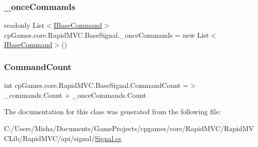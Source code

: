 \subsubsection{\texorpdfstring{\_onceCommands}{\_onceCommands}}
{\footnotesize\ttfamily readonly List$<$\mbox{\hyperlink{interfacecp_games_1_1core_1_1_rapid_m_v_c_1_1_i_base_command}{I\+Base\+Command}}$>$ cp\+Games.\+core.\+Rapid\+M\+V\+C.\+Base\+Signal.\+\_\+once\+Commands = new List$<$\mbox{\hyperlink{interfacecp_games_1_1core_1_1_rapid_m_v_c_1_1_i_base_command}{I\+Base\+Command}}$>$()\hspace{0.3cm}{\ttfamily [protected]}}

\mbox{\label{classcp_games_1_1core_1_1_rapid_m_v_c_1_1_base_signal_a3f273a225810de09d155144a5e948257}} 
\subsubsection{\texorpdfstring{CommandCount}{CommandCount}}
{\footnotesize\ttfamily int cp\+Games.\+core.\+Rapid\+M\+V\+C.\+Base\+Signal.\+Command\+Count =$>$ \+\_\+commands.\+Count + \+\_\+once\+Commands.\+Count}



The documentation for this class was generated from the following file\+:\begin{DoxyCompactItemize}
\item 
C\+:/\+Users/\+Misha/\+Documents/\+Game\+Projects/cpgames/core/\+Rapid\+M\+V\+C/\+Rapid\+M\+V\+C\+Lib/\+Rapid\+M\+V\+C/api/signal/\mbox{\hyperlink{_signal_8cs}{Signal.\+cs}}\end{DoxyCompactItemize}
